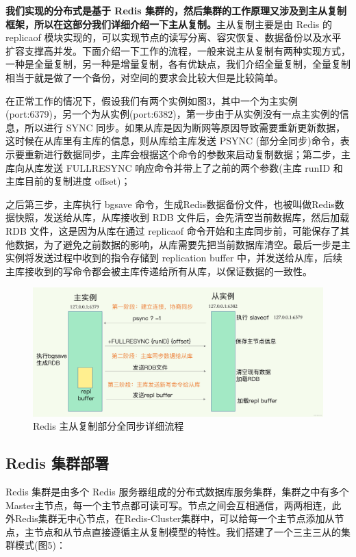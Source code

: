 \documentclass[12pt,hyperref,a4paper,UTF8]{ctexart}
\begin{document}
\textbf{我们实现的分布式是基于 Redis 集群的，然后集群的工作原理又涉及到主从复制框架，所以在这部分我们详细介绍一下主从复制。}主从复制主要是由 Redis 的 replicaof 模块实现的，可以实现节点的读写分离、容灾恢复、数据备份以及水平扩容支撑高并发。下面介绍一下工作的流程，一般来说主从复制有两种实现方式，一种是全量复制，另一种是增量复制，各有优缺点，我们介绍全量复制，全量复制相当于就是做了一个备份，对空间的要求会比较大但是比较简单。

在正常工作的情况下，假设我们有两个实例如图3，其中一个为主实例(port:6379)，另一个为从实例(port:6382)，第一步由于从实例没有一点主实例的信息，所以进行 SYNC 同步。如果从库是因为断网等原因导致需要重新更新数据，这时候在从库里有主库的信息，则从库给主库发送 PSYNC (部分全同步)命令，表示要重新进行数据同步，主库会根据这个命令的参数来启动复制数据；第二步，主库向从库发送 FULLRESYNC 响应命令并带上了之前的两个参数(主库 runID 和主库目前的复制进度 offset)；

之后第三步，主库执行 bgsave 命令，生成Redis数据备份文件，也被叫做Redis数据快照，发送给从库，从库接收到 RDB 文件后，会先清空当前数据库，然后加载 RDB 文件，这是因为从库在通过 replicaof 命令开始和主库同步前，可能保存了其他数据，为了避免之前数据的影响，从库需要先把当前数据库清空。最后一步是主实例将发送过程中收到的指令存储到 replication buffer 中，并发送给从库，后续主库接收到的写命令都会被主库传递给所有从库，以保证数据的一致性。

\begin{figure}[H]
\centering
\includegraphics[width=1\textwidth]{figures/master-slave.png}
\caption{Redis 主从复制部分全同步详细流程} 
\end{figure}

\subsection{Redis 集群部署}

Redis 集群是由多个 Redis 服务器组成的分布式数据库服务集群，集群之中有多个Master主节点，每一个主节点都可读可写。节点之间会互相通信，两两相连，此外Redis集群无中心节点，在Redis-Cluster集群中，可以给每一个主节点添加从节点，主节点和从节点直接遵循主从复制模型的特性。我们搭建了一个三主三从的集群模式(图5)：
\end{document}
